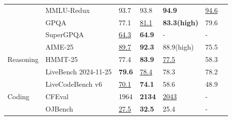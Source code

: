 \begin{table}[t]
\begin{tabular}{lllllll}
                                       & MMLU-Redux             & 93.7                       & 93.8                     & \textbf{94.9}               & \underline{94.6}                        \\
                                       & GPQA                   & 77.1                       & \underline{81.1}                     & \textbf{83.3(high)}         & 79.6                        \\
                                       & SuperGPQA              & \underline{64.3}                       & \textbf{64.9}                     & -                  & -                           \\
\midrule
                                       & AIME-25                 & \underline{89.7}                       & \textbf{92.3}                     & 88.9(high)         & 75.5                        \\

Reasoning                              & HMMT-25                 & 77.4                       & \textbf{83.9}                     & \underline{77.5}               & 58.3                        \\
                                       & LiveBench {\tiny 2024-11-25}          & \textbf{79.6}                       & \underline{78.4}                     & 78.3               & 78.2                        \\

\midrule
                                       & LiveCodeBench v6                 & \underline{70.1}                       & \textbf{74.1}                     & 58.6              & 48.9                        \\

Coding                                 & CFEval                 & 1964                       & \textbf{2134}                     & \underline{2043}               & -                           \\
                                       & OJBench                & \underline{27.5}                       & \textbf{32.5}                     & 25.4               & -                           \\
                                     

\end{tabular}
\end{table}
